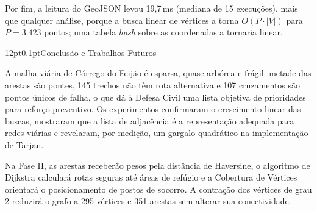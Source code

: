 \documentclass[12pt,a4paper]{article}
\makeatletter
\renewcommand\section{\@startsection{section}{1}{\z@}%
  {12pt}{0.1pt}{\normalfont\fontsize{13}{15}\selectfont\bfseries}}
\makeatother
\begin{document}
Por fim, a leitura do GeoJSON levou 19,7\,ms (mediana de 15 execuções), mais que qualquer análise, porque a busca linear de vértices a torna $O(P \cdot |V|)$ para $P = 3.423$ pontos; uma tabela \emph{hash} sobre as coordenadas a tornaria linear.

\section{Conclusão e Trabalhos Futuros}

A malha viária de Córrego do Feijão é esparsa, quase arbórea e frágil: metade das arestas são pontes, 145 trechos não têm rota alternativa e 107 cruzamentos são pontos únicos de falha, o que dá à Defesa Civil uma lista objetiva de prioridades para reforço preventivo. Os experimentos confirmaram o crescimento linear das buscas, mostraram que a lista de adjacência é a representação adequada para redes viárias e revelaram, por medição, um gargalo quadrático na implementação de Tarjan.

Na Fase II, as arestas receberão pesos pela distância de Haversine, o algoritmo de Dijkstra calculará rotas seguras até áreas de refúgio e a Cobertura de Vértices orientará o posicionamento de postos de socorro. A contração dos vértices de grau 2 reduzirá o grafo a 295 vértices e 351 arestas sem alterar sua conectividade.
\end{document}
